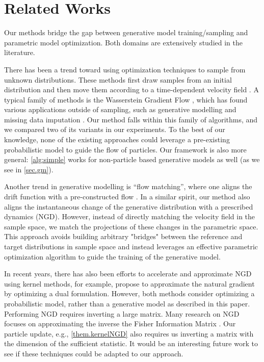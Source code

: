 \section{Related Works}

Our methods bridge the gap between generative model training/sampling and parametric model optimization. Both domains are extensively studied in the literature. 

There has been a trend toward using optimization techniques to sample from unknown distributions. These methods first draw samples from an initial distribution and then move them according to a time-dependent velocity field \citep{liu2017stein,Chewi2020,maurais2024sampling}. A typical family of methods is the Wasserstein Gradient Flow \citep{ambrosio2008gradient}, which has found various applications outside of sampling, such as generative modelling \citep{gaodeep19,choi2024scalable} and missing data imputation \citep{chen2024rethinking}. Our method falls within this family of algorithms, and we compared two of its variants in our experiments. 
To the best of our knowledge, none of the existing approaches could leverage a pre-existing probabilistic model to guide the flow of particles. Our framework is also more general: \cref{alg:simple} works for non-particle based generative models as well (as we see in \cref{sec.gm}). 

Another trend in generative modelling is ``flow matching'', where one aligns the drift function with a pre-constructed flow \citep{lipman2023flow,liu2023flow}. In a similar spirit, our method also aligns the instantaneous change of the generative  distribution with a prescribed dynamics (NGD). However, instead of directly matching the velocity field in the sample space, we match the projections of these changes in the parametric space. This approach avoids building arbitrary "bridges" between the reference and target distributions in sample space and instead leverages an effective parametric optimization algorithm to guide the training of the generative model.

In recent years, there has also been efforts to accelerate and approximate NGD using kernel methods, for example,   \citep{Arbel2020Kernelized,Li2019Affine} propose to approximate the natural gradient by optimizing a dual formulation. 
However, both methods consider optimizing a probabilistic model, rather than a generative model as described in this paper. Performing NGD requires inverting a large matrix. 
Many research on NGD focuses on approximating the inverse the Fisher Information Matrix \citep{martens15optimizing,grosse2016kronecker,george2018fast}. 
Our particle update, e.g., \cref{them.kernelNGD} also requires us inverting a matrix with the dimension of the sufficient statistic. 
It would be an interesting future work to see if these techniques could be adapted to our approach. 






